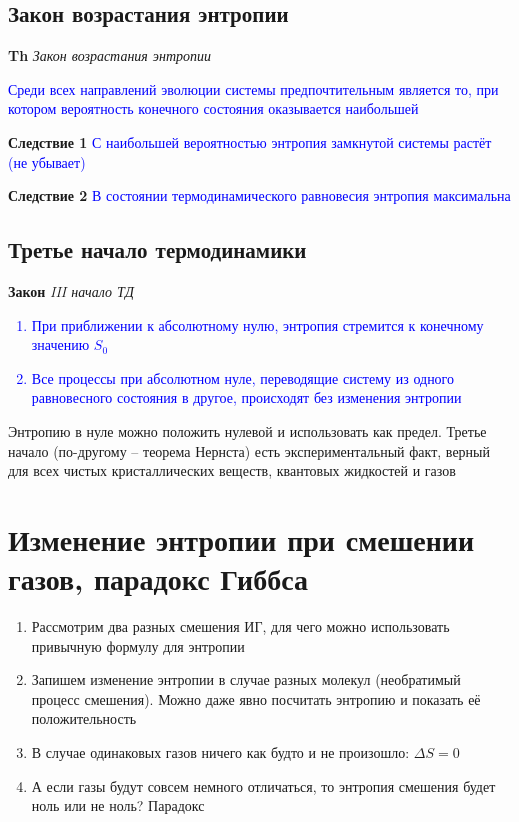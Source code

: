 \documentclass[a4paper, 14pt]{article}
\begin{document}
    \subsection{Закон возрастания энтропии}

    \textbf{Th} \textit{Закон возрастания энтропии}

    \textcolor{blue}{Среди всех направлений эволюции системы предпочтительным является то, при котором вероятность
    конечного состояния оказывается наибольшей}

    \textbf{Следствие 1} \textcolor{blue}{С наибольшей вероятностью энтропия замкнутой системы растёт (не убывает)}

    \textbf{Следствие 2} \textcolor{blue}{В состоянии термодинамического равновесия энтропия максимальна}

    \subsection{Третье начало термодинамики}

    \textbf{Закон} \textit{III начало ТД}
    \textcolor{blue}{
        \begin{enumerate}
            \item При приближении к абсолютному нулю, энтропия стремится к конечному значению $S_0$
            \item Все процессы при абсолютном нуле, переводящие систему из одного равновесного состояния
            в другое, происходят без изменения энтропии
        \end{enumerate}}

    Энтропию в нуле можно положить нулевой и использовать как предел.
    Третье начало (по-другому -- теорема Нернста) есть экспериментальный факт, верный для всех чистых кристаллических
    веществ, квантовых жидкостей и газов


    \section{Изменение энтропии при смешении газов, парадокс Гиббса}

    \begin{enumerate}
        \item Рассмотрим два разных смешения ИГ, для чего можно использовать привычную формулу для энтропии
        \item Запишем изменение энтропии в случае разных молекул (необратимый процесс смешения).
        Можно даже явно посчитать энтропию и показать её положительность
        \item В случае одинаковых газов ничего как будто и не произошло: $\Delta S = 0$
        \item А если газы будут совсем немного отличаться, то энтропия смешения будет ноль или не ноль?
        Парадокс
    \end{enumerate}
\end{document}

